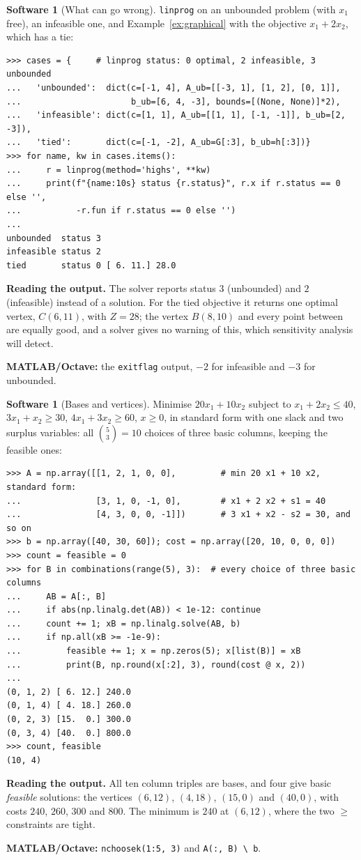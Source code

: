 \documentclass[11pt,a4paper]{article}
\numberwithin{equation}{section}
\theoremstyle{definition}
\newtheorem{software}[thm]{Software}
\begin{document}
\begin{software}[What can go wrong]
\label{sw:cases}
\texttt{linprog} on an unbounded problem (with $x_1$ free), an infeasible one, and Example~\ref{ex:graphical} with the objective $x_1 + 2x_2$, which has a tie:
{\small\begin{verbatim}
>>> cases = {     # linprog status: 0 optimal, 2 infeasible, 3 unbounded
...   'unbounded':  dict(c=[-1, 4], A_ub=[[-3, 1], [1, 2], [0, 1]],
...                      b_ub=[6, 4, -3], bounds=[(None, None)]*2),
...   'infeasible': dict(c=[1, 1], A_ub=[[1, 1], [-1, -1]], b_ub=[2, -3]),
...   'tied':       dict(c=[-1, -2], A_ub=G[:3], b_ub=h[:3])}
>>> for name, kw in cases.items():
...     r = linprog(method='highs', **kw)
...     print(f"{name:10s} status {r.status}", r.x if r.status == 0 else '',
...           -r.fun if r.status == 0 else '')
...
unbounded  status 3  
infeasible status 2  
tied       status 0 [ 6. 11.] 28.0
\end{verbatim}}
\textbf{Reading the output.} The solver reports status $3$ (unbounded) and $2$ (infeasible) instead of a solution. For the tied objective it returns one optimal vertex, $C(6, 11)$, with $Z = 28$; the vertex $B(8, 10)$ and every point between are equally good, and a solver gives no warning of this, which
sensitivity analysis will detect.

\textbf{MATLAB/Octave:} the \texttt{exitflag} output, $-2$ for infeasible and $-3$ for unbounded.
\end{software}

\begin{software}[Bases and vertices]
\label{sw:bases}
Minimise $20x_1 + 10x_2$ subject to $x_1 + 2x_2 \leq 40$, $3x_1 + x_2 \geq 30$, $4x_1 + 3x_2 \geq 60$, $x \geq 0$, in standard form with one slack and two surplus variables: all $\binom53 = 10$ choices of three basic columns, keeping the feasible ones:
{\small\begin{verbatim}
>>> A = np.array([[1, 2, 1, 0, 0],         # min 20 x1 + 10 x2, standard form:
...               [3, 1, 0, -1, 0],        # x1 + 2 x2 + s1 = 40
...               [4, 3, 0, 0, -1]])       # 3 x1 + x2 - s2 = 30, and so on
>>> b = np.array([40, 30, 60]); cost = np.array([20, 10, 0, 0, 0])
>>> count = feasible = 0
>>> for B in combinations(range(5), 3):  # every choice of three basic columns
...     AB = A[:, B]
...     if abs(np.linalg.det(AB)) < 1e-12: continue
...     count += 1; xB = np.linalg.solve(AB, b)
...     if np.all(xB >= -1e-9):
...         feasible += 1; x = np.zeros(5); x[list(B)] = xB
...         print(B, np.round(x[:2], 3), round(cost @ x, 2))
...
(0, 1, 2) [ 6. 12.] 240.0
(0, 1, 4) [ 4. 18.] 260.0
(0, 2, 3) [15.  0.] 300.0
(0, 3, 4) [40.  0.] 800.0
>>> count, feasible
(10, 4)
\end{verbatim}}
\textbf{Reading the output.} All ten column triples are bases, and four give basic \emph{feasible} solutions: the vertices $(6, 12)$, $(4, 18)$, $(15, 0)$ and $(40, 0)$, with costs $240$, $260$, $300$ and $800$. The minimum is $240$ at $(6, 12)$, where the two $\geq$ constraints are tight.

\textbf{MATLAB/Octave:} \texttt{nchoosek(1:5, 3)} and \texttt{A(:, B) \textbackslash\ b}.
\end{software}
\end{document}
